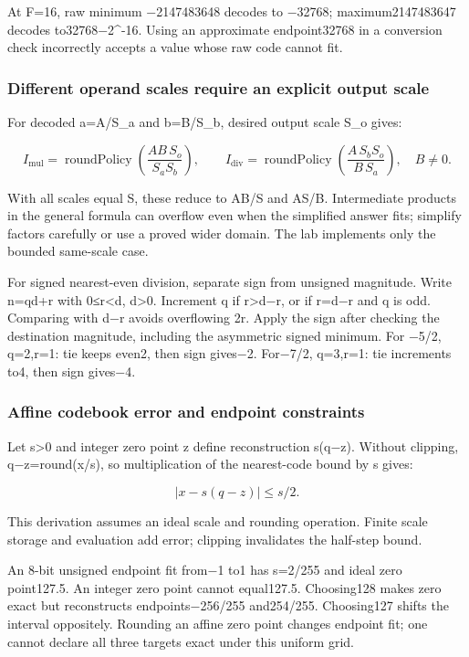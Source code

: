 At F=16, raw minimum −2147483648 decodes to −32768; maximum2147483647 decodes to32768−2\^{}-16. Using an approximate endpoint32768 in a conversion check incorrectly accepts a value whose raw code cannot fit.

\subsubsection{Different operand scales require an explicit output scale}\label{different-operand-scales-require-an-explicit-output-scale}

For decoded a=A/S\_a and b=B/S\_b, desired output scale S\_o gives:

\[
I_{\mathrm{mul}}=\operatorname{roundPolicy}
  \left(\frac{AB\,S_o}{S_aS_b}\right),
\qquad
I_{\mathrm{div}}=\operatorname{roundPolicy}
  \left(\frac{A\,S_bS_o}{B\,S_a}\right),\quad B\ne0.
\]

With all scales equal S, these reduce to AB/S and AS/B. Intermediate products in the general formula can overflow even when the simplified answer fits; simplify factors carefully or use a proved wider domain. The lab implements only the bounded same-scale case.

For signed nearest-even division, separate sign from unsigned magnitude. Write n=qd+r with 0≤r\textless d, d\textgreater0. Increment q if r\textgreater d−r, or if r=d−r and q is odd. Comparing with d−r avoids overflowing 2r. Apply the sign after checking the destination magnitude, including the asymmetric signed minimum. For −5/2, q=2,r=1: tie keeps even2, then sign gives−2. For−7/2, q=3,r=1: tie increments to4, then sign gives−4.

\subsubsection{Affine codebook error and endpoint constraints}\label{affine-codebook-error-and-endpoint-constraints}

Let s\textgreater0 and integer zero point z define reconstruction s(q−z). Without clipping, q−z=round(x/s), so multiplication of the nearest-code bound by s gives:

\[
\left|x-s(q-z)\right|\le s/2.
\]

This derivation assumes an ideal scale and rounding operation. Finite scale storage and evaluation add error; clipping invalidates the half-step bound.

An 8-bit unsigned endpoint fit from−1 to1 has s=2/255 and ideal zero point127.5. An integer zero point cannot equal127.5. Choosing128 makes zero exact but reconstructs endpoints−256/255 and254/255. Choosing127 shifts the interval oppositely. Rounding an affine zero point changes endpoint fit; one cannot declare all three targets exact under this uniform grid.

